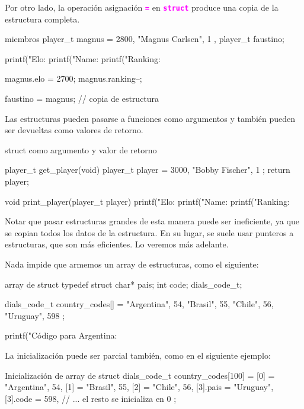 \documentclass[]{scrartcl}
\newcommand{\hl}[1]{\textcolor{magenta}{\textbf{\texttt{#1}}}}
\begin{document}
Por otro lado, la operación asignación \hl{=} en \hl{struct} produce una copia de la estructura completa.

\begin{cbox}[]{miembros}
player_t magnus = { 2800, "Magnus Carlsen", 1 },
player_t faustino;

printf("Elo: %
printf("Name: %
printf("Ranking: %

magnus.elo = 2700;
magnus.ranking--;

faustino = magnus; // copia de estructura
\end{cbox}

Las estructuras pueden pasarse a funciones como argumentos y también pueden ser devueltas como valores de retorno.

\begin{cbox}[]{struct como argumento y valor de retorno}

player_t get_player(void) {
  player_t player = { 3000, "Bobby Fischer", 1 };
  return player;
}

void print_player(player_t player) {
  printf("Elo: %
  printf("Name: %
  printf("Ranking: %
}

\end{cbox}

Notar que pasar estructuras grandes de esta manera puede ser ineficiente, ya que se copian todos los datos de la estructura. En su lugar, se suele usar punteros a estructuras, que son más eficientes. Lo veremos más adelante.

Nada impide que armemos un array de estructuras, como el siguiente:

\begin{cbox}[]{array de struct}
typedef struct {
  char* pais;
  int code;
} dials_code_t;

dials_code_t country_codes[] = {
  {"Argentina", 54},
  {"Brasil", 55},
  {"Chile", 56},
  {"Uruguay", 598}
};

printf("Código para Argentina: %
\end{cbox}

La inicialización puede ser parcial también, como en el siguiente ejemplo:

\begin{cbox}[]{Inicialización de array de struct}
dials_code_t country_codes[100] = {
  [0] = {"Argentina", 54},
  [1] = {"Brasil", 55},
  [2] = {"Chile", 56},
  [3].pais = "Uruguay", [3].code = 598,
  // ... el resto se inicializa en 0
};
\end{cbox}
\end{document}
